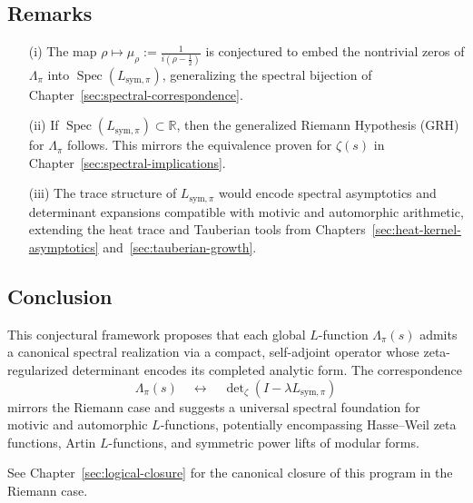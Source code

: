 \subsection*{Remarks}
\begin{itemize}
  \item[(i)] The map \( \rho \mapsto \mu_\rho := \frac{1}{i(\rho - \tfrac{1}{2})} \) is conjectured to embed the nontrivial zeros of \( \Lambda_\pi \) into \( \operatorname{Spec}(L_{\mathrm{sym},\pi}) \), generalizing the spectral bijection of Chapter~\ref{sec:spectral-correspondence}.

  \item[(ii)] If \( \operatorname{Spec}(L_{\mathrm{sym},\pi}) \subset \mathbb{R} \), then the generalized Riemann Hypothesis (GRH) for \( \Lambda_\pi \) follows. This mirrors the equivalence proven for \( \zeta(s) \) in Chapter~\ref{sec:spectral-implications}.

  \item[(iii)] The trace structure of \( L_{\mathrm{sym},\pi} \) would encode spectral asymptotics and determinant expansions compatible with motivic and automorphic arithmetic, extending the heat trace and Tauberian tools from Chapters~\ref{sec:heat-kernel-asymptotics} and~\ref{sec:tauberian-growth}.
\end{itemize}

\vspace{1.5ex}
\subsection*{Conclusion}

This conjectural framework proposes that each global \( L \)-function \( \Lambda_\pi(s) \) admits a canonical spectral realization via a compact, self-adjoint operator whose zeta-regularized determinant encodes its completed analytic form. The correspondence
\[
\Lambda_\pi(s) \quad \longleftrightarrow \quad \det\nolimits_\zeta(I - \lambda L_{\mathrm{sym},\pi})
\]
mirrors the Riemann case and suggests a universal spectral foundation for motivic and automorphic \( L \)-functions, potentially encompassing Hasse–Weil zeta functions, Artin \( L \)-functions, and symmetric power lifts of modular forms.

\medskip
\noindent
See Chapter~\ref{sec:logical-closure} for the canonical closure of this program in the Riemann case.
